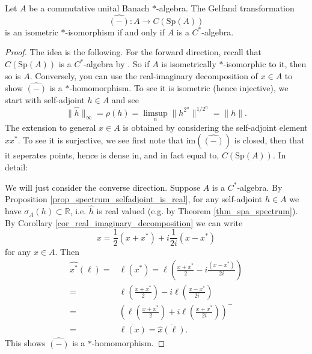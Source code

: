 \documentclass[12pt]{article}
\begin{document}
\begin{theorem}
\label{thm_gelfand_naimark_cstar}
	Let $A$ be a commutative unital Banach $\ast$-algebra. The Gelfand transformation 
	\begin{equation*}
		\widehat{(-)}:A\longrightarrow C(\text{Sp}(A))
	\end{equation*}
	is an isometric $\ast$-isomorphism if and only if $A$ is a $C^\ast$-algebra.
\end{theorem}
\begin{proof}
	The idea is the following. For the forward direction, recall that $C(\text{Sp}(A))$ is a $C^\ast$-algebra by . So if $A$ is isometrically $\ast$-isomorphic to it, then so is $A$. Conversely, you can use the real-imaginary decomposition of $x\in A$ to show $\widehat{(-)}$ is a $\ast$-homomorphism. To see it is isometric (hence injective), we start with self-adjoint $h\in A$ and see 
	\begin{equation*}
		\|\hat{h}\|_\infty = \rho(h) = \limsup_n\|h^{2^n}\|^{1/2^n} = \|h\|.
	\end{equation*}
	The extension to general $x\in A$ is obtained by considering the self-adjoint element $xx^\ast$. To see it is surjective, we see first note that $\text{im}(\widehat{(-)})$ is closed, then that it seperates points, hence is dense in, and in fact equal to, $C(\text{Sp}(A))$. In detail:

	We will just consider the converse direction. Suppose $A$ is a $C^\ast$-algebra. By Proposition \ref{prop_spectrum_selfadjoint_is_real}, for any self-adjoint $h\in A$ we have $\sigma_A(h)\subset\mathbb{R}$, i.e. $\hat{h}$ is real valued (e.g. by Theorem \ref{thm_spa_spectrum}). By Corollary \ref{cor_real_imaginary_decomposition} we can write 
	\begin{equation*}
		x = \frac{1}{2}(x+x^\ast) + i\frac{1}{2i}(x-x^\ast)
	\end{equation*}
	for any $x\in A$. Then
	\begin{align*}
		\widehat{x^\ast}(\ell) 
		=& \ell(x^\ast) = \ell\left(\frac{x+x^\ast}{2} - i\frac{(x-x^\ast)}{2i}\right) \\
		=& \ell\left(\frac{x+x^\ast}{2}\right) - i\ell\left(\frac{x-x^\ast}{2i}\right) \\
		=& \left( \ell\left(\frac{x+x^\ast}{2}\right) + i\ell\left(\frac{x+x^\ast}{2i}\right)\right)^- \\
		=& \overline{\ell(x)} = \overline{\hat{x}(\ell)}.
	\end{align*}
	This shows $\widehat{(-)}$ is a $\ast$-homomorphism.


\end{proof}
\end{document}
